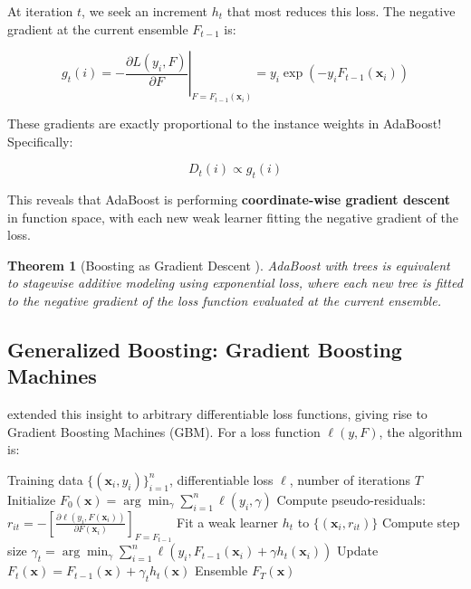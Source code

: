 \documentclass[12pt,letterpaper]{article}
\newtheorem{theorem}{Theorem}[section]
\begin{document}
At iteration $t$, we seek an increment $h_t$ that most reduces this loss. The negative gradient at the current ensemble $F_{t-1}$ is:

\begin{equation}
g_t(i) = -\left.\frac{\partial L(y_i, F)}{\partial F}\right|_{F=F_{t-1}(\mathbf{x}_i)} = y_i \exp(-y_i F_{t-1}(\mathbf{x}_i))
\end{equation}

These gradients are exactly proportional to the instance weights in AdaBoost! Specifically:

\begin{equation}
D_t(i) \propto g_t(i)
\end{equation}

This reveals that AdaBoost is performing \textbf{coordinate-wise gradient descent} in function space, with each new weak learner fitting the negative gradient of the loss.

\begin{theorem}[Boosting as Gradient Descent \citep{friedman2000additive}]
AdaBoost with trees is equivalent to stagewise additive modeling using exponential loss, where each new tree is fitted to the negative gradient of the loss function evaluated at the current ensemble.
\end{theorem}

\subsection{Generalized Boosting: Gradient Boosting Machines}

\citet{friedman2001greedy} extended this insight to arbitrary differentiable loss functions, giving rise to Gradient Boosting Machines (GBM). For a loss function $\ell(y, F)$, the algorithm is:

\begin{algorithm}[H]
\caption{Gradient Boosting}
\label{alg:gradientboost}
\begin{algorithmic}[1]
\REQUIRE Training data $\{(\mathbf{x}_i, y_i)\}_{i=1}^n$, differentiable loss $\ell$, number of iterations $T$
\STATE Initialize $F_0(\mathbf{x}) = \arg\min_\gamma \sum_{i=1}^n \ell(y_i, \gamma)$
    \STATE Compute pseudo-residuals: $r_{it} = -\left[\frac{\partial \ell(y_i, F(\mathbf{x}_i))}{\partial F(\mathbf{x}_i)}\right]_{F=F_{t-1}}$
    \STATE Fit a weak learner $h_t$ to $\{(\mathbf{x}_i, r_{it})\}$
    \STATE Compute step size $\gamma_t = \arg\min_\gamma \sum_{i=1}^n \ell(y_i, F_{t-1}(\mathbf{x}_i) + \gamma h_t(\mathbf{x}_i))$
    \STATE Update $F_t(\mathbf{x}) = F_{t-1}(\mathbf{x}) + \gamma_t h_t(\mathbf{x})$
\ENDFOR
\RETURN Ensemble $F_T(\mathbf{x})$
\end{algorithmic}
\end{algorithm}
\end{document}
